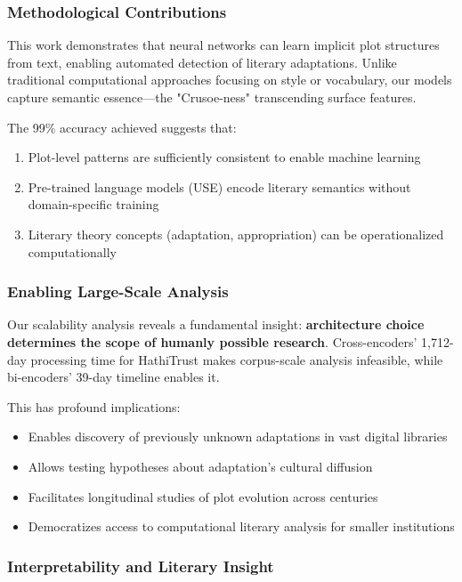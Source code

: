 \documentclass[12pt,a4paper]{article}
\begin{document}
\subsubsection{Methodological Contributions}

This work demonstrates that neural networks can learn implicit plot structures from text, enabling automated detection of literary adaptations. Unlike traditional computational approaches focusing on style or vocabulary, our models capture semantic essence—the "Crusoe-ness" transcending surface features.

The 99\% accuracy achieved suggests that:
\begin{enumerate}
    \item Plot-level patterns are sufficiently consistent to enable machine learning
    \item Pre-trained language models (USE) encode literary semantics without domain-specific training
    \item Literary theory concepts (adaptation, appropriation) can be operationalized computationally
\end{enumerate}

\subsubsection{Enabling Large-Scale Analysis}

Our scalability analysis reveals a fundamental insight: \textbf{architecture choice determines the scope of humanly possible research}. Cross-encoders' 1,712-day processing time for HathiTrust makes corpus-scale analysis infeasible, while bi-encoders' 39-day timeline enables it.

This has profound implications:
\begin{itemize}
    \item Enables discovery of previously unknown adaptations in vast digital libraries
    \item Allows testing hypotheses about adaptation's cultural diffusion
    \item Facilitates longitudinal studies of plot evolution across centuries
    \item Democratizes access to computational literary analysis for smaller institutions
\end{itemize}

\subsubsection{Interpretability and Literary Insight}
\end{document}
